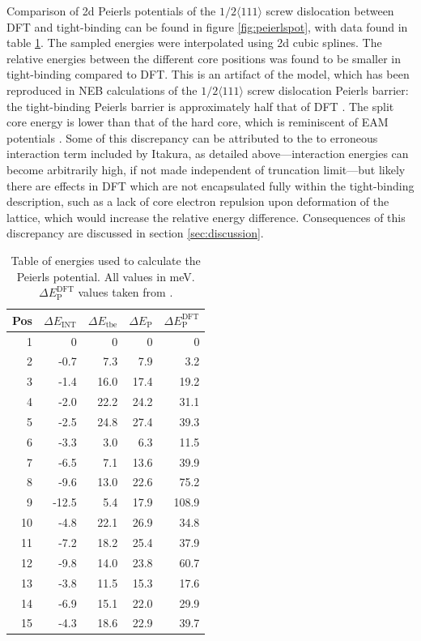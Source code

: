 \documentclass[a4paper,11pt]{article}
\begin{document}
Comparison of 2d Peierls potentials of the \(1/2\langle 111 \rangle\) screw dislocation between DFT and
tight-binding can be found in figure \ref{fig:peierlspot}, with data found in table
\ref{tab:peierlspot}. The sampled energies were interpolated using 2d
cubic splines. The relative energies between the different core positions was found to be
smaller in tight-binding compared to DFT. This is an artifact of the model, which has been
reproduced in NEB calculations of the \(1/2\langle 111\rangle\) screw dislocation Peierls barrier: the
tight-binding Peierls barrier is approximately half that of DFT \cite{Simpson2019}. The split
core energy is lower than that of the hard core, which is reminiscent of EAM potentials
\cite{Itakura2012}. Some of this discrepancy can be attributed to the to erroneous interaction
term included by Itakura, as detailed above---interaction energies can become arbitrarily
high, if not made independent of truncation limit---but likely there are effects in DFT
which are not encapsulated fully within the tight-binding description, such as a lack of core electron
repulsion upon deformation of the lattice, which would increase the relative energy
difference. Consequences of this discrepancy are discussed in section \ref{sec:discussion}.


\begin{table}[htbp]
\caption{Table of energies used to calculate the Peierls potential. All values in meV. \(\Delta E_{\text{P}}^{\text{DFT}}\) values taken from \cite{Itakura2012}. \label{tab:peierlspot}}
\centering
\begin{tabular}{rrrrr}
Pos & \(\Delta E_{\text{INT}}\) & \(\Delta E_{\text{tbe}}\) & \(\Delta E_{\text{P}}\) & \(\Delta E_{\text{P}}^{\text{DFT}}\)\\
\hline
1 & 0 & 0 & 0 & 0\\
2 & -0.7 & 7.3 & 7.9 & 3.2\\
3 & -1.4 & 16.0 & 17.4 & 19.2\\
4 & -2.0 & 22.2 & 24.2 & 31.1\\
5 & -2.5 & 24.8 & 27.4 & 39.3\\
6 & -3.3 & 3.0 & 6.3 & 11.5\\
7 & -6.5 & 7.1 & 13.6 & 39.9\\
8 & -9.6 & 13.0 & 22.6 & 75.2\\
9 & -12.5 & 5.4 & 17.9 & 108.9\\
10 & -4.8 & 22.1 & 26.9 & 34.8\\
11 & -7.2 & 18.2 & 25.4 & 37.9\\
12 & -9.8 & 14.0 & 23.8 & 60.7\\
13 & -3.8 & 11.5 & 15.3 & 17.6\\
14 & -6.9 & 15.1 & 22.0 & 29.9\\
15 & -4.3 & 18.6 & 22.9 & 39.7\\
\end{tabular}
\end{table}
\end{document}
